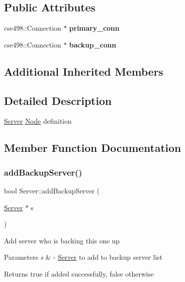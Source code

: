 \subsection*{Public Attributes}
\begin{DoxyCompactItemize}
\item 
\mbox{\label{classServer_a7fe98722519ecd9fea0c2b03f6d68c5f}} 
cse498\+::\+Connection $\ast$ {\bfseries primary\+\_\+conn}
\item 
\mbox{\label{classServer_a95044513452fb2dc480bf28433c84573}} 
cse498\+::\+Connection $\ast$ {\bfseries backup\+\_\+conn}
\end{DoxyCompactItemize}
\subsection*{Additional Inherited Members}


\subsection{Detailed Description}
\mbox{\hyperlink{classServer}{Server}} \mbox{\hyperlink{classNode}{Node}} definition 

\subsection{Member Function Documentation}
\mbox{\label{classServer_ab272570a3b1d8eb7f9037c9e7b4e5f2a}} 
\subsubsection{\texorpdfstring{add\+Backup\+Server()}{addBackupServer()}}
{\footnotesize\ttfamily bool Server\+::add\+Backup\+Server (\begin{DoxyParamCaption}\item[{\mbox{\hyperlink{classServer}{Server}} $\ast$}]{s }\end{DoxyParamCaption})}

Add server who is backing this one up


\begin{DoxyParams}{Parameters}
{\em s} & -\/ \mbox{\hyperlink{classServer}{Server}} to add to backup server list\\
\hline
\end{DoxyParams}
\begin{DoxyReturn}{Returns}
true if added successfully, false otherwise 
\end{DoxyReturn}
\mbox{\label{classServer_a395d7cb7194064c961710663926e4a3d}} 
